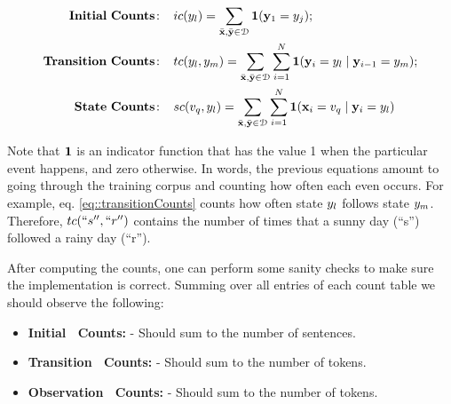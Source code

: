 \begin{align}
\mathbf{Initial \ Counts\!:}\;\;\;\;  &  ic(\hv_l) = \sum_{\trex} 
\Ind (\hs_1 = \hv_j); \label{eq::initialCounts}\\
%
%
\mathbf{Transition \ Counts\!:}\;\;\;\;  &  tc(\hv_l,\hv _m) =
\sum_{\trex} \sum_{i = 1}^{N} \Ind (\hs_i = \hv_l \mid \hs_{i-1} = \hv_m); \label{eq::transitionCounts}\\
%
\mathbf{State \ Counts\!:}\;\;\;\;  &  sc(\vv_q,\hv_l) = \sum_{\trex} \sum_{i = 1}^{N}
\Ind (\obs_i = \vv_q\mid \hs_i = \hv_l) \label{eq::stateCounts}
\end{align}

Note that $\textbf{1}$ is an indicator function that has the value 1 when the
particular event happens, and zero otherwise. In words, the previous
equations amount to going through the training corpus and counting how
often each even occurs. For example, eq. \eqref{eq::transitionCounts} counts how often state ${y}_l$ follows state ${y}_m$. Therefore, $tc(``s'',``r'')$ contains the number of times that a sunny day (``s'') followed a rainy day (``r'').

%


After computing the counts, one can perform some sanity checks
to make sure the implementation is correct. Summing over all entries
of each count table we should observe the following:

\begin{itemize}
\item \textbf{Initial \ Counts\!:} - Should sum to the number of
  sentences.
\item \textbf{Transition \ Counts\!:} - Should sum to the number of
  tokens.
\item \textbf{Observation \ Counts\!:} - Should sum to the number of tokens.
\end{itemize}



